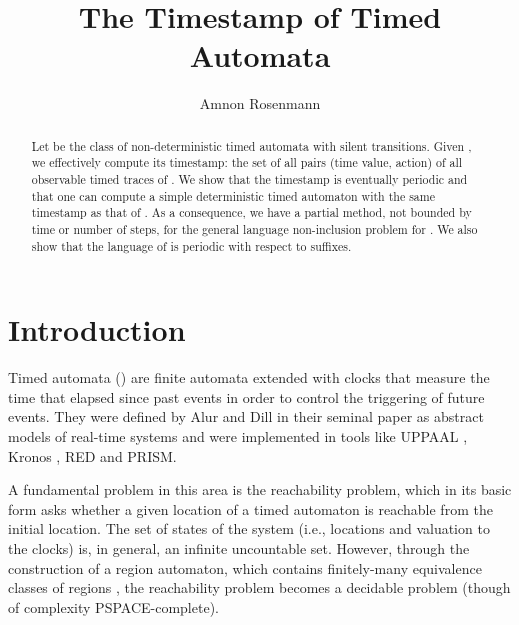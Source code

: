 \documentclass[11pt]{amsart}
\theoremstyle{definition}
\begin{document}
\title{The Timestamp of Timed Automata}
\author{Amnon Rosenmann}
\address{Graz University of Technology, Steyrergasse 30, A-8010 Graz, Austria}



\date{}
\maketitle

\begin{abstract}
Let  be the class of non-deterministic timed automata with silent transitions. Given , we effectively compute its timestamp: the set of all pairs (time value, action) of all observable timed traces of . We show that the timestamp is eventually periodic and that one can compute a simple deterministic timed automaton with the same timestamp as that of . As a consequence, we have a partial method, not bounded by time or number of steps, for the general language non-inclusion problem for . We also show that the language of  is periodic with respect to suffixes. 
\end{abstract}
\section{Introduction}
\label{sec:intro}
Timed automata () are finite automata extended with clocks that measure the time that elapsed since past events in order to control the triggering of future events.
They were defined by Alur and Dill in their seminal paper \cite{ta} as abstract models of real-time systems and were implemented in tools like UPPAAL \cite{uppaal}, Kronos \cite{Kronos98}, RED \cite{Wang04} and PRISM\cite{Prism11}.

A fundamental problem in this area is the reachability problem, which in its basic form asks whether a given location of a timed automaton is reachable from the initial location.
The set of states of the system (i.e., locations and valuation to the clocks) is, in general, an infinite uncountable set.
However, through the construction of a region automaton, which contains finitely-many equivalence classes of regions \cite{ta}, the reachability problem becomes a decidable problem (though of complexity PSPACE-complete).
\end{document}
